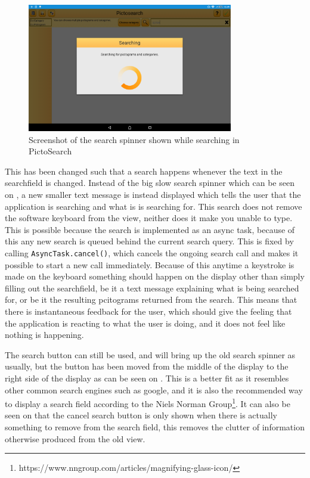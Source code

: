 \begin{figure}[h]
    \centering
    \includegraphics[width=0.8\textwidth]{figures/img/screenshots/old_dialog.png}
    \caption{Screenshot of the search spinner shown while searching in PictoSearch}\label{fig:screenshot_searchspinner}
\end{figure}
This has been changed such that a search happens whenever the text in the searchfield is changed.
Instead of the big slow search spinner which can be seen on , a new smaller text message is instead displayed which tells the user that the application is searching and what is is searching for. 
This search does not remove the software keyboard from the view, neither does it make you unable to type.
This is possible because the search is implemented as an async task, because of this any new search is queued behind the current search query.
This is fixed by calling \texttt{AsyncTask.cancel()}, which cancels the ongoing search call and makes it possible to start a new call immediately.
Because of this anytime a keystroke is made on the keyboard something should happen on the display other than simply filling out the searchfield, be it a text message explaining what is being searched for, or be it the resulting pcitograms returned from the search.
This means that there is instantaneous feedback for the user, which should give the feeling that the application is reacting to what the user is doing, and it does not feel like nothing is happening.

The search button can still be used, and will bring up the old search spinner as usually, but the button has been moved from the middle of the display to the right side of the display as can be seen on .
This is a better fit as it resembles other common search engines such as google, and it is also the recommended way to display a search field according to the Niels Norman Group\footnote{https://www.nngroup.com/articles/magnifying-glass-icon/}.
It can also be seen on  that the cancel search button is only shown when there is actually something to remove from the search field, this removes the clutter of information otherwise produced from the old view.

